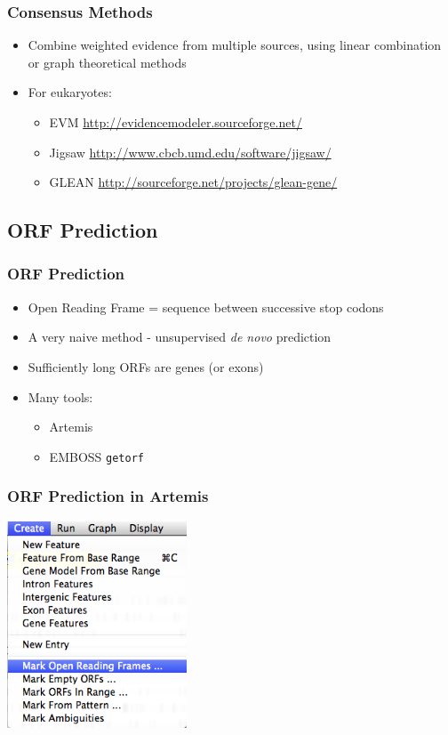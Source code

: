 \documentclass[table]{beamer}
\begin{document}
    \begin{frame}
     \frametitle{Consensus Methods}
     \begin{itemize}
       \item Combine weighted evidence from multiple sources, using linear combination or graph theoretical methods
       \item For eukaryotes:
       \begin{itemize}
         \item EVM \url{http://evidencemodeler.sourceforge.net/}
         \item Jigsaw \url{http://www.cbcb.umd.edu/software/jigsaw/}
         \item GLEAN \url{http://sourceforge.net/projects/glean-gene/}
       \end{itemize}
     \end{itemize}
    \end{frame}
  
    \subsection{ORF Prediction}
    \begin{frame}
     \frametitle{ORF Prediction}
     \begin{itemize}
       \item Open Reading Frame = sequence between successive stop codons
       \item A very naive method - unsupervised \textit{de novo} prediction
       \item Sufficiently long ORFs are genes (or exons)
       \item Many tools:
       \begin{itemize}
         \item Artemis
         \item EMBOSS \texttt{getorf}
       \end{itemize}
     \end{itemize}
    \end{frame}

    \begin{frame}
      \frametitle{ORF Prediction in Artemis}    
      \begin{center}
        \includegraphics[width=0.4\textwidth]{images/artemis_orf0}     
      \end{center}
    \end{frame}
\end{document}
